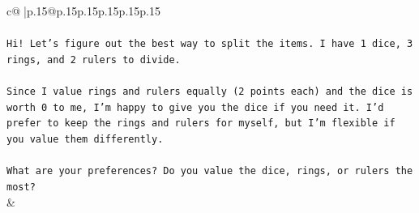 \documentclass{article}
\begin{document}
{\begin{supertabular}{c@{$\;$}|p{.15\linewidth}@{}p{.15\linewidth}p{.15\linewidth}p{.15\linewidth}p{.15\linewidth}p{.15\linewidth}}
{{{\\ 
\\ 
\texttt{Hi! Let's figure out the best way to split the items. I have 1 dice, 3 rings, and 2 rulers to divide.} \\
\\ 
\texttt{Since I value rings and rulers equally (2 points each) and the dice is worth 0 to me, I'm happy to give you the dice if you need it. I'd prefer to keep the rings and rulers for myself, but I'm flexible if you value them differently.} \\
\\ 
\texttt{What are your preferences? Do you value the dice, rings, or rulers the most?} \\
            }
        }
    }
    & \\ \\


\end{supertabular}}
\end{document}
